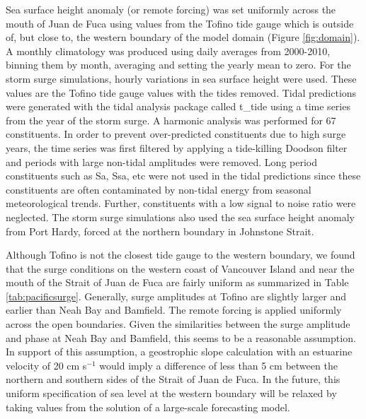 \documentclass[letterpaper]{tATO2e}
\begin{document}
Sea surface height anomaly (or remote forcing) was set uniformly across the mouth of Juan de Fuca using values from the Tofino tide gauge \citep{DFOObservations} which is outside of, but close to, the western boundary of the model domain (Figure \ref{fig:domain}).  A monthly climatology was produced using daily averages from 2000-2010, binning them by month, averaging and setting the yearly mean to zero.  For the storm surge simulations, hourly variations in sea surface height were used.  These values are the Tofino tide gauge values with the tides removed. {\color{red}Tidal predictions were generated with the tidal analysis package called t\_tide \citep{pawlowicz2002classical} using a time series from the year of the storm surge. A harmonic analysis was performed for 67 constituents. In order to prevent over-predicted constituents due to high surge years, the time series was first filtered by applying a tide-killing Doodson filter \citep{parker2007NOAA} and periods with large non-tidal amplitudes were removed. Long period constituents such as Sa, Ssa, etc were not used in the tidal predictions since these constituents are often contaminated by non-tidal energy from seasonal meteorological trends. Further, constituents with a low signal to noise ratio were neglected. } The storm surge simulations also used the sea surface height anomaly from Port Hardy, forced at the northern boundary in Johnstone Strait. 

{\color{red} Although Tofino is not the closest tide gauge to the western boundary, we found that the surge conditions on the western coast of Vancouver Island and near the mouth of the Strait of Juan de Fuca are fairly uniform as summarized in Table \ref{tab:pacificsurge}. Generally, surge amplitudes at Tofino are slightly larger and earlier than Neah Bay and Bamfield. The remote forcing is applied uniformly across the open boundaries. Given the similarities between the surge amplitude and phase at Neah Bay and Bamfield, this seems to be a reasonable assumption. In support of this assumption, a geostrophic slope calculation with an estuarine velocity of 20 cm s$^{-1}$ would imply a difference of less than 5 cm between the northern and southern sides of the Strait of Juan de Fuca. In the future, this uniform specification of sea level at the western boundary will be relaxed by taking values from the solution of a large-scale forecasting model.} 
\end{document}
